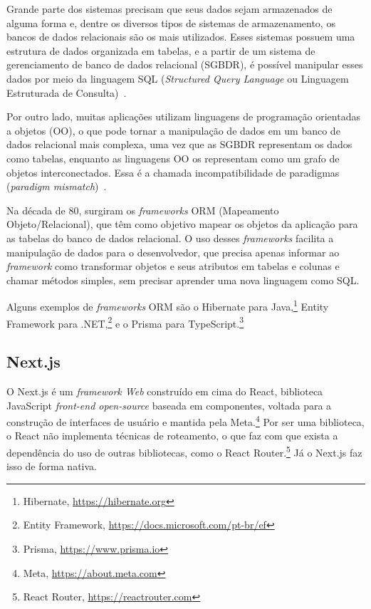 Grande parte dos sistemas precisam que seus dados sejam armazenados de alguma forma e,
dentre os diversos tipos de sistemas de armazenamento, os bancos de dados relacionais são
os mais utilizados. Esses sistemas possuem uma estrutura de dados organizada em tabelas, e a partir de 
um sistema de gerenciamento de banco de dados relacional (SGBDR), é possível manipular esses dados
por meio da linguagem SQL (\textit{Structured Query Language} ou Linguagem Estruturada de Consulta)~\cite{silberschatz:2019}.

Por outro lado, muitas aplicações utilizam linguagens de programação orientadas a objetos (OO), o que
pode tornar a manipulação de dados em um banco de dados relacional mais complexa, uma vez que
as SGBDR representam os dados como tabelas, enquanto as linguagens OO os representam como um grafo 
de objetos interconectados. Essa é a chamada incompatibilidade de paradigmas (\textit{paradigm mismatch})~\cite{hibernate:2010,bauer:2005}.

Na década de 80, surgiram os \textit{frameworks} ORM (Mapeamento Objeto/Relacional), que têm como objetivo
mapear os objetos da aplicação para as tabelas do banco de dados relacional. O uso desses \textit{frameworks} 
facilita a manipulação de dados para o desenvolvedor, que precisa apenas informar ao \textit{framework}
como transformar objetos e seus atributos em tabelas e colunas e chamar métodos simples, sem precisar
aprender uma nova linguagem como SQL.

Alguns exemplos de \textit{frameworks} ORM são o Hibernate para Java,\footnote{Hibernate, \url{https://hibernate.org}}
Entity Framework para .NET,\footnote{Entity Framework, \url{https://docs.microsoft.com/pt-br/ef}} e o 
Prisma para TypeScript.\footnote{Prisma, \url{https://www.prisma.io}}



\subsection{Next.js}
\label{sec-fundteo-framework-next}

O Next.js é um \textit{framework Web} construído em cima do React, biblioteca JavaScript \textit{front-end open-source}
baseada em componentes, voltada para a construção de interfaces de usuário e mantida pela Meta.\footnote{Meta, \url{https://about.meta.com}}
Por ser uma biblioteca, o React não implementa 
técnicas de roteamento, o que faz com que exista a dependência do uso de outras bibliotecas, 
como o React Router.\footnote{React Router, \url{https://reactrouter.com}}
Já o Next.js faz isso de forma nativa. 

